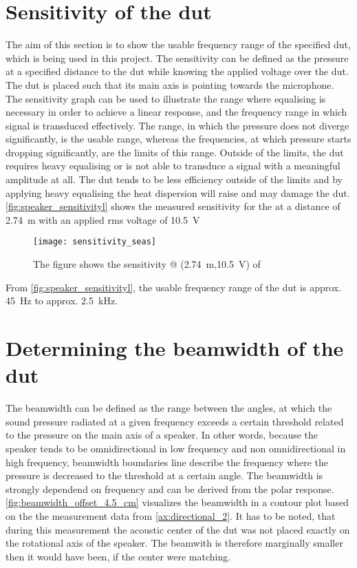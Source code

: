 \section{Sensitivity of the \gls{dut}}
The aim of this section is to show the usable frequency range of the specified \gls{dut}, which is being used in this project. The sensitivity can be defined as the pressure at a specified distance to the \gls{dut} while knowing the applied voltage over the \gls{dut}. The \gls{dut} is placed such that its main axis is pointing towards the microphone. The sensitivity graph can be used to illustrate the range where equalising is necessary in order to achieve a linear response, and the frequency range in which signal is transduced effectively. The range, in which the pressure does not diverge significantly, is the usable range, whereas the frequencies, at which pressure starts dropping significantly, are the limits of this range. Outside of the limits, the \gls{dut} requires heavy equalising or is not able to transduce a signal with a meaningful amplitude at all. The \gls{dut} tends to be less efficiency outside of the limits and by applying heavy equalising the heat dispersion will raise and may damage the \gls{dut}. \autoref{fig:speaker_sensitivityl} shows the measured sensitivity for the \citep{seas33} at a distance of \SI{2.74}{\meter} with an applied \gls{rms} voltage of \SI{10.5}{\volt}


\begin{figure}[H]
	\centering
	\texttt{[image: sensitivity\_seas]}
	\caption{The figure shows the sensitivity @ (\SI{2.74}{\meter},\SI{10.5}{\volt}) of  \citep{seas33}}
		\label{fig:speaker_sensitivityl}
\end{figure}

From \autoref{fig:speaker_sensitivityl}, the usable frequency range of the \gls{dut} is approx. \SI{45}{\hertz} to approx. \SI{2.5}{\kilo\hertz}.


\section{Determining the beamwidth of the \gls{dut}}\label{sec:beamwidth}
The beamwidth can be defined as the range between the angles, at which the sound pressure radiated at a given frequency exceeds a certain threshold related to the pressure on the main axis of a speaker. In other words, because the speaker tends to be omnidirectional in low frequency and non omnidirectional in high frequency, beamwidth boundaries line describe the frequency where the pressure is decreased to the threshold at a certain angle. The beamwidth is strongly dependend on frequency and can be derived from the polar response. \autoref{fig:beamwidth_offset_4.5_cm} visualizes the beamwidth in a contour plot based on the the measurement data from \autoref{ax:directional_2}. It has to be noted, that during this measurement the acoustic center of the \gls{dut} was not placed exactly on the rotational axis of the speaker. The beamwith is therefore marginally smaller then it would have been, if the center were matching.

